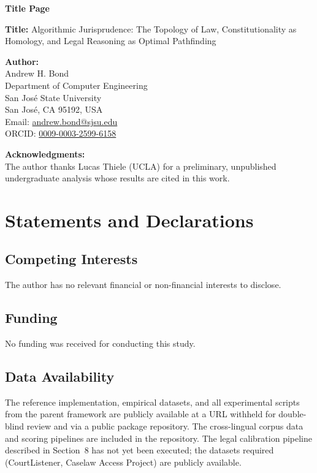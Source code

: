 \documentclass[12pt]{article}
\begin{document}
\begin{center}
{\LARGE\bfseries Title Page}
\end{center}

\bigskip

\noindent\textbf{Title:} Algorithmic Jurisprudence: The Topology of Law, Constitutionality as Homology, and Legal Reasoning as Optimal Pathfinding

\bigskip

\noindent\textbf{Author:}\\
Andrew H. Bond\\
Department of Computer Engineering\\
San Jos\'{e} State University\\
San Jos\'{e}, CA 95192, USA\\
Email: \href{mailto:andrew.bond@sjsu.edu}{andrew.bond@sjsu.edu}\\
ORCID: \href{https://orcid.org/0009-0003-2599-6158}{0009-0003-2599-6158}

\bigskip

\noindent\textbf{Acknowledgments:}\\
The author thanks Lucas Thiele (UCLA) for a preliminary, unpublished undergraduate analysis whose results are cited in this work.

\bigskip

\section*{Statements and Declarations}

\subsection*{Competing Interests}
The author has no relevant financial or non-financial interests to disclose.

\subsection*{Funding}
No funding was received for conducting this study.

\subsection*{Data Availability}
The reference implementation, empirical datasets, and all experimental scripts from the parent framework are publicly available at a URL withheld for double-blind review and via a public package repository. The cross-lingual corpus data and scoring pipelines are included in the repository. The legal calibration pipeline described in Section~8 has not yet been executed; the datasets required (CourtListener, Caselaw Access Project) are publicly available.
\end{document}
